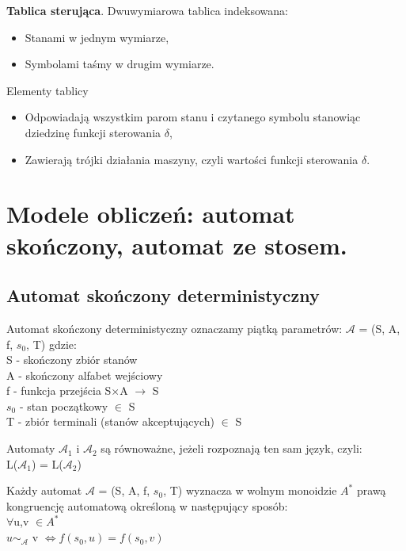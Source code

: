 \documentclass[main.tex]{subfiles}
\begin{document}
    \begin{definition}
        \textbf{Tablica sterująca}. Dwuwymiarowa tablica indeksowana:
        \begin{itemize}
            \item Stanami w jednym wymiarze,
            \item Symbolami taśmy w drugim wymiarze.
        \end{itemize}
        Elementy tablicy
        \begin{itemize}
            \item Odpowiadają wszystkim parom stanu i czytanego symbolu stanowiąc dziedzinę
            funkcji sterowania $\delta$,
            \item Zawierają trójki działania maszyny, czyli wartości funkcji sterowania $\delta$.
        \end{itemize}
    \end{definition}

    \newpage

    \section{Modele obliczeń: automat skończony, automat ze stosem.}
    \subsection{Automat skończony deterministyczny}
    \begin{definition}
        Automat skończony deterministyczny oznaczamy piątką parametrów: $\mathcal{A}$ = (S, A, f, $s_{0}$, T) gdzie: \\
        S - skończony zbiór stanów \\
        A - skończony alfabet wejściowy \\
        f - funkcja przejścia S$\times$A $\rightarrow$ S \\
        $s_{0}$ - stan początkowy $\in$ S\\
        T - zbiór terminali (stanów akceptujących) $\in$ S
    \end{definition}

    \begin{definition}
        Automaty $\mathcal{A}_{1}$ i  $\mathcal{A}_{2}$ są równoważne, jeżeli rozpoznają ten sam język, czyli: \\
        L($\mathcal{A}_{1}$) = L($\mathcal{A}_{2}$)
    \end{definition}

    \begin{definition}
        Każdy automat $\mathcal{A}$ = (S, A, f, $s_{0}$, T) wyznacza w wolnym monoidzie $A^{*}$ prawą kongruencję automatową określoną w następujący sposób: \\
        $\forall$u,v $\in A^{*}$ \\
        $u \sim_\mathcal{A}$ v $\Leftrightarrow f(s_{0}, u) = f(s_{0}, v)$
    \end{definition}
\end{document}
